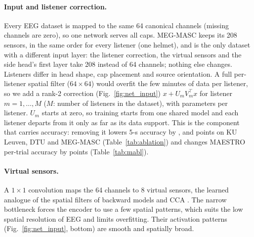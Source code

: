 \documentclass[10pt,twocolumn,letterpaper]{article}
\begin{document}
\begin{table}[h]\centering\small
\caption{CoupleFlow modules and parameter counts (KU Leuven checkpoint; $^\ast$envelope-only
input). GN: GroupNorm; GELU: Gaussian error linear unit; MLP: multilayer perceptron. Only the rows in the decision path are needed at test time for the
coupling decision; the flow head is needed for the PMI rule.}\label{tab:arch}

\end{table}

\paragraph{Input and listener correction.} Every EEG dataset is mapped to the same 64
canonical channels (missing channels are zero), so one network serves all caps. MEG-MASC
keeps its 208 sensors, in the same order for every listener (one helmet), and is the only
dataset with a different input layer: the listener correction, the virtual sensors and the
side head's first layer take 208 instead of 64 channels; nothing else changes. Listeners
differ in head shape, cap placement and source orientation. A full per-listener spatial
filter ($64\times64$) would overfit the few minutes of data per listener, so we add a
rank-2 correction (Fig.~\ref{fig:net_input}) $x+U_m V_m^{\top}x$ for listener $m=1,\dots,M$
($M$: number of listeners in the dataset), with \archPerListener{} parameters per listener. $U_m$ starts at zero, so training starts from one shared
model and each listener departs from it only as far as its data support. This is the
component that carries accuracy: removing it lowers 5-s accuracy by \ablRankKUL, \ablRankDTU{} and \ablRankMEG{} points on
KU Leuven, DTU and MEG-MASC
(Table~\ref{tab:ablation}) and changes MAESTRO per-trial accuracy by \maAblRank{} points
(Table~\ref{tab:mabl}).

\paragraph{Virtual sensors.} A $1{\times}1$ convolution maps the 64 channels to 8
virtual sensors, the learned analogue of the spatial filters of backward models and CCA
\citep{crosse2016mtrf,decheveigne2018decoding}. The narrow bottleneck forces the encoder
to use a few spatial patterns, which suits the low spatial resolution of EEG and limits
overfitting. Their activation patterns (Fig.~\ref{fig:net_input}, bottom) are smooth and
spatially broad.
\end{document}
